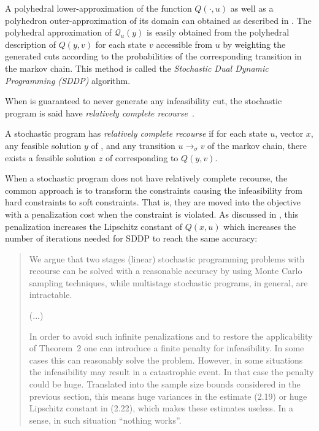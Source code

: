 \documentclass[11pt,twoside,a4paper,openright]{uclouvain-thesis}
\newcommand{\tr}{\to}
\newcommand{\trs}[1][\sigma]{\tr_{#1}}
\begin{document}
A polyhedral lower-approximation of the function $Q(\cdot, u)$ as well as a polyhedron outer-approximation of its domain can obtained  as described in .
The polyhedral approximation of $\mathcal{Q}_u(y)$ is easily obtained from the polyhedral
description of $Q(y, v)$ for each state $v$ accessible from $u$ by weighting the
generated cuts according to the probabilities of the corresponding transition in the markov chain.
This method is called the \emph{Stochastic Dual Dynamic Programming (SDDP)} algorithm.

When  is guaranteed to never generate any infeasibility cut,
the stochastic program is said have \emph{relatively complete recourse}~\cite[p.~92]{birge2011introduction}.

\begin{mydef}
  A stochastic program has \emph{relatively complete recourse}
  if for each state $u$, vector $x$,
  any feasible solution $y$ of ,
  and any transition $u \trs v$ of the markov chain,
  there exists a feasible solution $z$ of 
  corresponding to $Q(y, v)$.
\end{mydef}

When a stochastic program does not have relatively complete recourse,
the common approach is to transform the constraints causing the infeasibility
from hard constraints to soft constraints.
That is, they are moved into the objective with a penalization cost when the constraint is violated.
As discussed in \cite{shapiro2005complexity},
this penalization increases the Lipschitz constant of $Q(x, u)$ which
increases the number of iterations needed for SDDP to reach the same accuracy:
\begin{quote}
  We argue that two stages (linear) stochastic programming problems with recourse can be solved with a reasonable accuracy by using Monte Carlo sampling techniques,
  while multistage stochastic programs,
  in general, are intractable.

  (...)

  In order to avoid such infinite penalizations and to restore
  the applicability of Theorem~2 one can introduce a finite penalty for infeasibility.
  In some cases this can reasonably solve the problem. However, in some situations
  the infeasibility may result in a catastrophic event. In that case the penalty could
  be huge. Translated into the sample size bounds considered in the previous section,
  this means huge variances in the estimate (2.19) or huge Lipschitz constant in (2.22),
  which makes these estimates useless. In a sense, in such situation ``nothing works''.
\end{quote}
\end{document}
